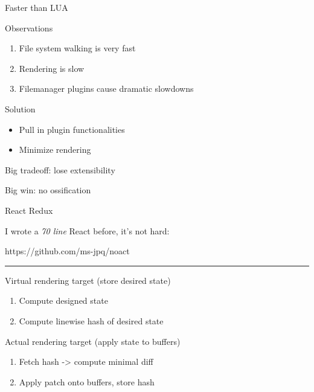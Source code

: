 \documentclass{beamer}
\begin{document}
\begin{frame}{Faster than LUA}

	\begin{block}{Observations}

		\begin{enumerate}

			\item File system walking is very fast

			\item Rendering is slow

			\item Filemanager plugins cause dramatic slowdowns

		\end{enumerate}

	\end{block}

	\begin{block}{Solution}

		\begin{itemize}

			\item Pull in plugin functionalities

			\item Minimize rendering

		\end{itemize}
 	
	\end{block}

	Big tradeoff: lose extensibility

	Big win: no ossification

\end{frame}


\begin{frame}{React Redux}

	I wrote a \textit{70 line} React before, it's not hard:

	https://github.com/ms-jpq/noact

	\rule{\textwidth}{0.1em}

	Virtual rendering target (store desired state)

	\begin{enumerate}

		\item Compute designed state

		\item Compute linewise hash of desired state

	\end{enumerate}

	Actual rendering target (apply state to buffers)

	\begin{enumerate}

		\item Fetch hash -> compute minimal diff

		\item Apply patch onto buffers, store hash

	\end{enumerate}

\end{frame}
\end{document}
